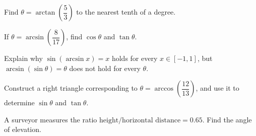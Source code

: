 \begin{exercise}
Find $\theta = \arctan\left(\dfrac53\right)$ to the nearest tenth of a
degree.
\end{exercise}

\begin{exercise}
If $\theta = \arcsin\left(\dfrac{8}{17}\right)$, find $\cos\theta$ and
$\tan\theta$.
\end{exercise}

\begin{exercise}
Explain why $\sin(\arcsin x) = x$ holds for every $x \in [-1,1]$, but
$\arcsin(\sin\theta) = \theta$ does not hold for every $\theta$.
\end{exercise}

\begin{exercise}
Construct a right triangle corresponding to $\theta = \arccos\left(\dfrac{12}{13}\right)$,
and use it to determine $\sin\theta$ and $\tan\theta$.
\end{exercise}

\begin{exercise}
A surveyor measures the ratio $\text{height}/\text{horizontal distance} =
0.65$. Find the angle of elevation.
\end{exercise}
